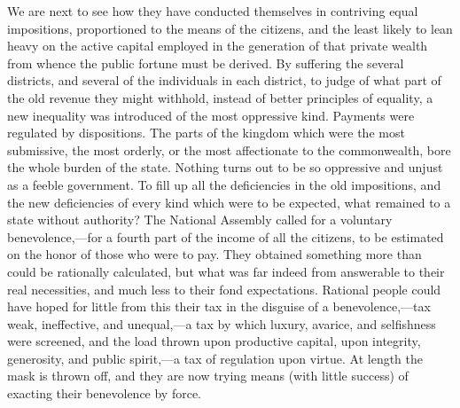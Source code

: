 We are next to see how they have conducted themselves in contriving equal impositions, proportioned to the means of the citizens, and the least likely to lean heavy on the active capital employed in the generation of that private wealth from whence the public fortune must be derived. By suffering the several districts, and several of the individuals in each district, to judge of what part of the old revenue they might withhold, instead of better principles of equality, a new inequality was introduced of the most oppressive kind. Payments were regulated by dispositions. The parts of the kingdom which were the most submissive, the most orderly, or the most affectionate to the commonwealth, bore the whole burden of the state. Nothing turns out to be so oppressive and unjust as a feeble government. To fill up all the deficiencies in the old impositions, and the new deficiencies of every kind which were to be expected, what remained to a state without authority? The National Assembly called for a voluntary benevolence,—for a fourth part of the income of all the citizens, to be estimated on the honor of those who were to pay. They obtained something more than could be rationally calculated, but what was far indeed from answerable to their real necessities, and much less to their fond expectations. Rational people could have hoped for little from this their tax in the disguise of a benevolence,—tax weak, ineffective, and unequal,—a tax by which luxury, avarice, and selfishness were screened, and the load thrown upon productive capital, upon integrity, generosity, and public spirit,—a tax of regulation upon virtue. At length the mask is thrown off, and they are now trying means (with little success) of exacting their benevolence by force.

